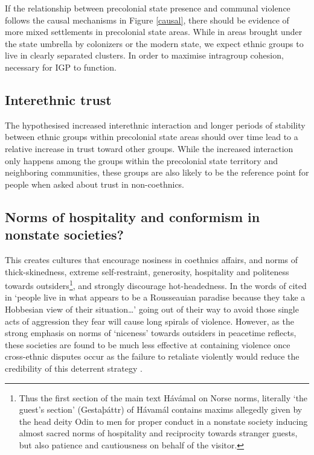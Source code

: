 \documentclass[12pt]{article}
\begin{document}
If the relationship between precolonial state presence and communal violence
follows the causal mechanisms in Figure \ref{causal}, there should be evidence
of more mixed settlements in precolonial state areas. While in areas brought under
the state umbrella by colonizers or the modern state, we expect ethnic groups to
live in clearly separated clusters. In order to maximise intragroup cohesion,
necessary for IGP to function.

\subsection{Interethnic trust}

The hypothesised increased interethnic interaction and longer periods of
stability between ethnic groups within precolonial state areas should over time
lead to a relative increase in trust toward other groups. While the increased
interaction only happens among the groups within the precolonial state territory
and neighboring communities, these groups are also likely to be the reference
point for people when asked about trust in non-coethnics.

\subsection{Norms of hospitality and conformism in nonstate societies?}


This creates cultures that encourage nosiness in coethnics affairs, and norms of
thick-skinedness, extreme self-restraint, generosity, hospitality and politeness
towards outsiders\footnote{Thus the first section of the main text Hávámal on
	Norse norms, literally ‘the guest’s section’ (Gestaþáttr) of Hávamál
	contains maxims allegedly given by the head deity Odin to men for proper
	conduct in a nonstate society inducing almost sacred norms of
hospitality and reciprocity towards stranger guests, but also patience and
cautiousness on behalf of the visitor.}, and strongly discourage hot-headedness.
In the words of \citet[37]{Colson1974} cited in \citep[199]{Cohen2004} ‘people
live in what appears to be a Rousseauian paradise because they take a Hobbesian
view of their situation…’ going out of their way to avoid those single acts of
aggression they fear will cause long spirals of violence. However, as the strong
emphasis on norms of ‘niceness’ towards outsiders in peacetime reflects, these
societies are found to be much less effective at containing violence once
cross-ethnic disputes occur as the failure to retaliate violently would reduce
the credibility of this deterrent strategy \citep[723f]{Fearon_1996}.
\end{document}
